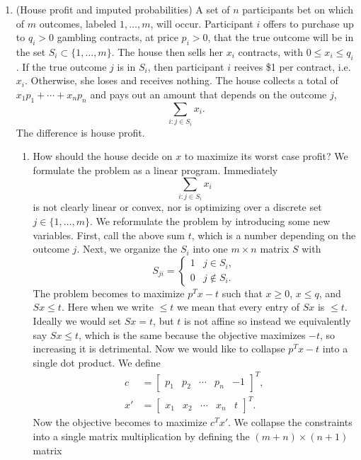 \documentclass{article}
\begin{document}
\begin{enumerate}
\item (House profit and imputed probabilities) A set of $n$ participants bet on which of $m$ outcomes, labeled $1, \dots, m$, will occur. Participant $i$ offers to purchase up to $q_i > 0$ gambling contracts, at price $p_i > 0$, that the true outcome will be in the set $S_i \subset \{1, \dots, m\}$. The house then sells her $x_i$ contracts, with $0 \leq x_i \leq q_i$. If the true outcome $j$ is in $S_i$, then participant $i$ reeives \$1 per contract, i.e. $x_i$. Otherwise, she loses and receives nothing. The house collects a total of $x_1p_1 + \cdots + x_np_n$ and pays out an amount that depends on the outcome $j$, \[
        \sum_{i : j \in S_i} x_i.
    \] The difference is house profit.
    \begin{enumerate}
        \item How should the house decide on $x$ to maximize its worst case profit? We formulate the problem as a linear program. Immediately \[
            \sum_{i : j \in S_i} x_i
        \] is not clearly linear or convex, nor is optimizing over a discrete set $j \in \{1, \dots, m\}$. We reformulate the problem by introducing some new variables. First, call the above sum $t$, which is a number depending on the outcome $j$. Next, we organize the $S_i$ into one $m \times n$ matrix $S$ with \[
            S_{ji} = \begin{cases}
                1 & j \in S_i, \\
                0 & j \notin S_i.
            \end{cases}
        \] The problem becomes to maximize $p^T x - t$ such that $x \geq 0$, $x \leq q$, and $Sx \leq t$. Here when we write $\leq t$ we mean that every entry of $Sx$ is $\leq t$. Ideally we would set $Sx = t$, but $t$ is not affine so instead we equivalently say $Sx \leq t$, which is the same because the objective maximizes $-t$, so increasing it is detrimental. Now we would like to collapse $p^T x - t$ into a single dot product. We define \begin{align*}
            c &= \begin{bmatrix}
                p_1 & p_2 & \cdots & p_n & -1
            \end{bmatrix}^T, \\
            x' &= \begin{bmatrix}
                x_1 & x_2 & \cdots & x_n & t
            \end{bmatrix}^T.
        \end{align*} Now the objective becomes to maximize $c^T x'$. We collapse the constraints into a single matrix multiplication by defining the $(m + n) \times (n + 1)$ matrix \[
\]
\end{enumerate}
\end{enumerate}
\end{document}

